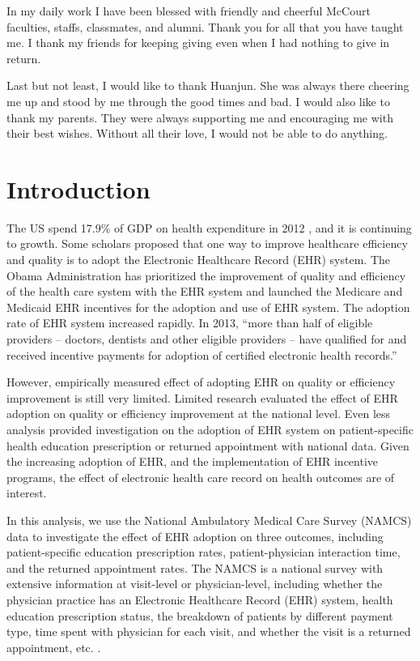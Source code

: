 \documentclass[12pt]{report}
\begin{document}
In my daily work I have been blessed with friendly and cheerful McCourt faculties, staffs, classmates, and alumni. Thank you for all that you have taught me. I thank my friends for keeping giving even when I had nothing to give in return.

Last but not least, I would like to thank Huanjun. She was always there cheering me up and stood by me through the good times and bad. I would also like to thank my parents. They were always supporting me and encouraging me with their best wishes. Without all their love, I would not be able to do anything.

\tableofcontents

\listoffigures  %
\listoftables   %

\newpage

\chapter{Introduction}
The US spend 17.9\% of GDP on health expenditure in 2012 \citep{wbgHealthGDP}, and it is continuing to growth. Some scholars proposed that one way to improve healthcare efficiency and quality is to adopt the Electronic Healthcare Record (EHR) system. The Obama Administration has prioritized the improvement of quality and efficiency of the health care system with the EHR system and launched the Medicare and Medicaid EHR incentives for the adoption and use of EHR system. The adoption rate of EHR system increased rapidly. In 2013, ``more than half of eligible providers -- doctors, dentists and other eligible providers -- have qualified for and received incentive payments for adoption of certified electronic health records.'' \citep{whitehouseblogintro}

However, empirically measured effect of adopting EHR on quality or efficiency improvement is still very limited. Limited research evaluated the effect of EHR adoption on quality or efficiency improvement at the national level. Even less analysis provided investigation on the adoption of EHR system on patient-specific health education prescription or returned appointment with national data. Given the increasing adoption of EHR, and the implementation of EHR incentive programs, the effect of electronic health care record on health outcomes are of interest.

In this analysis, we use the National Ambulatory Medical Care Survey (NAMCS) data to investigate the effect of EHR adoption on three outcomes, including patient-specific education prescription rates, patient-physician interaction time, and the returned appointment rates. The NAMCS is a national survey with extensive information at visit-level or physician-level, including whether the physician practice has an Electronic Healthcare Record (EHR) system, health education prescription status, the breakdown of patients by different payment type, time spent with physician for each visit, and whether the visit is a returned appointment, etc. .
\end{document}
